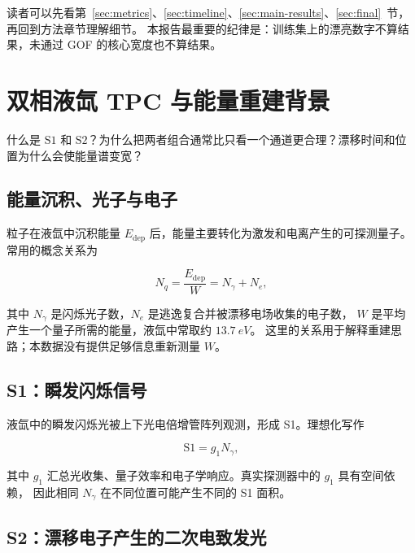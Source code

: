 \documentclass[UTF8,12pt,a4paper,oneside,fontset=none]{ctexart}
\numberwithin{equation}{section}
\newcommand{\Sone}{\mathrm{S1}}
\newcommand{\Stwo}{\mathrm{S2}}
\begin{document}
\begin{conclusionbox}
读者可以先看第~\ref{sec:metrics}、\ref{sec:timeline}、\ref{sec:main-results}、\ref{sec:final}~节，
再回到方法章节理解细节。
本报告最重要的纪律是：训练集上的漂亮数字不算结果，未通过 GOF 的核心宽度也不算结果。
\end{conclusionbox}

\section{双相液氙 TPC 与能量重建背景}

\begin{questionbox}
什么是 \(\Sone\) 和 \(\Stwo\)？为什么把两者组合通常比只看一个通道更合理？漂移时间和位置为什么会使能量谱变宽？
\end{questionbox}

\subsection{能量沉积、光子与电子}

粒子在液氙中沉积能量 \(E_{\mathrm{dep}}\) 后，能量主要转化为激发和电离产生的可探测量子。
常用的概念关系为

\begin{equation}
N_q
=
\frac{E_{\mathrm{dep}}}{W}
=
N_{\gamma}+N_e,
\label{eq:quanta}
\end{equation}

其中 \(N_{\gamma}\) 是闪烁光子数，\(N_e\) 是逃逸复合并被漂移电场收集的电子数，
\(W\) 是平均产生一个量子所需的能量，液氙中常取约 \(\SI{13.7}{eV}\)\cite{pandax-bb2nu}。
这里的关系用于解释重建思路；本数据没有提供足够信息重新测量 \(W\)。

\subsection{S1：瞬发闪烁信号}

液氙中的瞬发闪烁光被上下光电倍增管阵列观测，形成 S1。理想化写作

\begin{equation}
\Sone=g_1N_{\gamma},
\label{eq:s1}
\end{equation}

其中 \(g_1\) 汇总光收集、量子效率和电子学响应。真实探测器中的 \(g_1\) 具有空间依赖，
因此相同 \(N_{\gamma}\) 在不同位置可能产生不同的 S1 面积。

\subsection{S2：漂移电子产生的二次电致发光}
\end{document}
